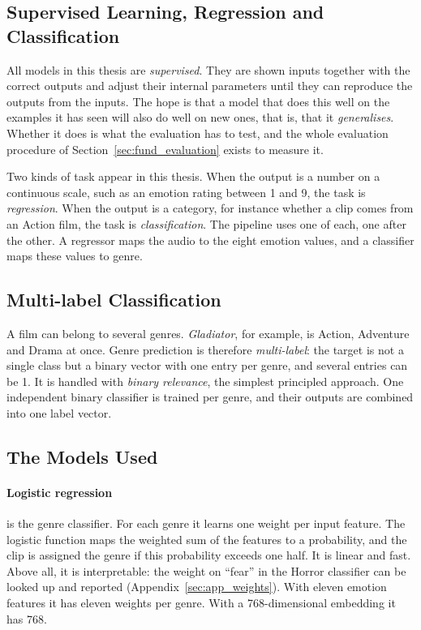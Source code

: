 \subsection{Supervised Learning, Regression and Classification}

All models in this thesis are \emph{supervised}. They are shown inputs together with the correct outputs and adjust their internal parameters until they can reproduce the outputs from the inputs. The hope is that a model that does this well on the examples it has seen will also do well on new ones, that is, that it \emph{generalises}. Whether it does is what the evaluation has to test, and the whole evaluation procedure of Section~\ref{sec:fund_evaluation} exists to measure it.

Two kinds of task appear in this thesis. When the output is a number on a continuous scale, such as an emotion rating between 1 and 9, the task is \emph{regression}. When the output is a category, for instance whether a clip comes from an Action film, the task is \emph{classification}. The pipeline uses one of each, one after the other. A regressor maps the audio to the eight emotion values, and a classifier maps these values to genre.

\subsection{Multi-label Classification}

A film can belong to several genres. \emph{Gladiator}, for example, is Action, Adventure and Drama at once. Genre prediction is therefore \emph{multi-label}: the target is not a single class but a binary vector with one entry per genre, and several entries can be 1. It is handled with \emph{binary relevance}, the simplest principled approach. One independent binary classifier is trained per genre, and their outputs are combined into one label vector.

\subsection{The Models Used}

\paragraph{Logistic regression} is the genre classifier. For each genre it learns one weight per input feature. The logistic function maps the weighted sum of the features to a probability, and the clip is assigned the genre if this probability exceeds one half. It is linear and fast. Above all, it is interpretable: the weight on ``fear'' in the Horror classifier can be looked up and reported (Appendix~\ref{sec:app_weights}). With eleven emotion features it has eleven weights per genre. With a 768-dimensional embedding it has 768.

